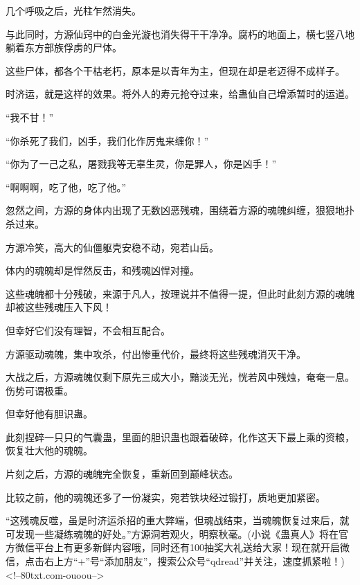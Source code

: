 \begin{this_body}
几个呼吸之后，光柱乍然消失。

与此同时，方源仙窍中的白金光漩也消失得干干净净。腐朽的地面上，横七竖八地躺着东方部族俘虏的尸体。

这些尸体，都各个干枯老朽，原本是以青年为主，但现在却是老迈得不成样子。

时济运，就是这样的效果。将外人的寿元抢夺过来，给蛊仙自己增添暂时的运道。

“我不甘！”

“你杀死了我们，凶手，我们化作厉鬼来缠你！”

“你为了一己之私，屠戮我等无辜生灵，你是罪人，你是凶手！”

“啊啊啊，吃了他，吃了他。”

忽然之间，方源的身体内出现了无数凶恶残魂，围绕着方源的魂魄纠缠，狠狠地扑杀过来。

方源冷笑，高大的仙僵躯壳安稳不动，宛若山岳。

体内的魂魄却是悍然反击，和残魂凶悍对撞。

这些魂魄都十分残破，来源于凡人，按理说并不值得一提，但此时此刻方源的魂魄却被这些残魂压入下风！

但幸好它们没有理智，不会相互配合。

方源驱动魂魄，集中攻杀，付出惨重代价，最终将这些残魂消灭干净。

大战之后，方源魂魄仅剩下原先三成大小，黯淡无光，恍若风中残烛，奄奄一息。伤势可谓极重。

但幸好他有胆识蛊。

此刻捏碎一只只的气囊蛊，里面的胆识蛊也跟着破碎，化作这天下最上乘的资粮，恢复壮大他的魂魄。

片刻之后，方源的魂魄完全恢复，重新回到巅峰状态。

比较之前，他的魂魄还多了一份凝实，宛若铁块经过锻打，质地更加紧密。

“这残魂反噬，虽是时济运杀招的重大弊端，但魂战结束，当魂魄恢复过来后，就可发现一些凝练魂魄的好处。”方源洞若观火，明察秋毫。(小说《蛊真人》将在官方微信平台上有更多新鲜内容哦，同时还有100抽奖大礼送给大家！现在就开启微信，点击右上方“+”号“添加朋友”，搜索公众号“qdread”并关注，速度抓紧啦！)<!--80txt.com-ouoou-->

\end{this_body}

